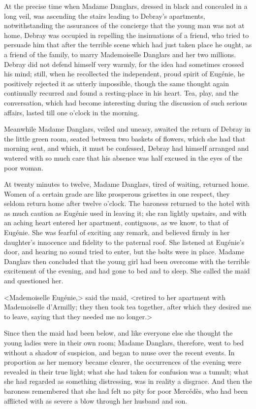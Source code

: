  At the precise time when Madame Danglars, dressed in black and concealed in a long veil, was ascending the stairs leading to Debray's apartments, notwithstanding the assurances of the concierge that the young man was not at home, Debray was occupied in repelling the insinuations of a friend, who tried to persuade him that after the terrible scene which had just taken place he ought, as a friend of the family, to marry Mademoiselle Danglars and her two millions. Debray did not defend himself very warmly, for the idea had sometimes crossed his mind; still, when he recollected the independent, proud spirit of Eugénie, he positively rejected it as utterly impossible, though the same thought again continually recurred and found a resting-place in his heart. Tea, play, and the conversation, which had become interesting during the discussion of such serious affairs, lasted till one o'clock in the morning. 

 Meanwhile Madame Danglars, veiled and uneasy, awaited the return of Debray in the little green room, seated between two baskets of flowers, which she had that morning sent, and which, it must be confessed, Debray had himself arranged and watered with so much care that his absence was half excused in the eyes of the poor woman. 

 At twenty minutes to twelve, Madame Danglars, tired of waiting, returned home. Women of a certain grade are like prosperous grisettes in one respect, they seldom return home after twelve o'clock. The baroness returned to the hotel with as much caution as Eugénie used in leaving it; she ran lightly upstairs, and with an aching heart entered her apartment, contiguous, as we know, to that of Eugénie. She was fearful of exciting any remark, and believed firmly in her daughter's innocence and fidelity to the paternal roof. She listened at Eugénie's door, and hearing no sound tried to enter, but the bolts were in place. Madame Danglars then concluded that the young girl had been overcome with the terrible excitement of the evening, and had gone to bed and to sleep. She called the maid and questioned her. 

 <Mademoiselle Eugénie,> said the maid, <retired to her apartment with Mademoiselle d'Armilly; they then took tea together, after which they desired me to leave, saying that they needed me no longer.> 

 Since then the maid had been below, and like everyone else she thought the young ladies were in their own room; Madame Danglars, therefore, went to bed without a shadow of suspicion, and began to muse over the recent events. In proportion as her memory became clearer, the occurrences of the evening were revealed in their true light; what she had taken for confusion was a tumult; what she had regarded as something distressing, was in reality a disgrace. And then the baroness remembered that she had felt no pity for poor Mercédès, who had been afflicted with as severe a blow through her husband and son. 

